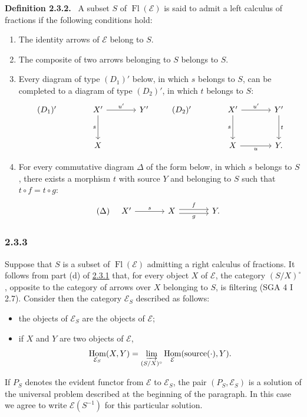 \documentclass[11pt]{article}
\newenvironment{statement}[1]{\par\medskip\noindent\textbf{#1.}\ }{\par\medskip}
\DeclareMathOperator{\Hom}{Hom}
\providecommand{\Hom}{\operatorname{Hom}}
\providecommand{\Fl}{\operatorname{Fl}}
\providecommand{\cE}{\mathcal E}
\providecommand{\source}{\operatorname{source}}
\providecommand{\Hom}{\operatorname{Hom}}
\begin{document}
\label{sga5:V:definition:2.3.2}\begin{statement}{Definition 2.3.2}
A subset $S$ of $\Fl(\cE)$ is said to admit a left calculus of fractions if the following conditions hold:
\begin{enumerate}[label=(\alph*)]
\item[(a')] The identity arrows of $\cE$ belong to $S$.
\item[(b')] The composite of two arrows belonging to $S$ belongs to $S$.
\item[(c')] Every diagram of type $(D_1)'$ below, in which $s$ belongs to $S$, can be completed to a diagram of type $(D_2)'$, in which $t$ belongs to $S$:
\[
\begin{tikzcd}[column sep=large,row sep=large]
(D_1)'& X' \arrow[r,"u'"] \arrow[d,"s"'] & Y'\\
& X
\end{tikzcd}
\qquad
\begin{tikzcd}[column sep=large,row sep=large]
(D_2)'& X' \arrow[r,"u'"] \arrow[d,"s"'] & Y' \arrow[d,"t"]\\
& X \arrow[r,"u"'] & Y .
\end{tikzcd}
\]
\item[(d')] For every commutative diagram $\Delta$ of the form below, in which $s$ belongs to $S$, there exists a morphism $t$ with source $Y$ and belonging to $S$ such that $t\circ f=t\circ g$:
\[
(\Delta)\quad
\begin{tikzcd}[column sep=large]
X' \arrow[r,"s"] & X \arrow[r,shift left,"f"] \arrow[r,shift right,"g"'] & Y .
\end{tikzcd}
\]
\end{enumerate}
\end{statement}

\subsubsection*{2.3.3}\label{sga5:V:subsubsection:2.3.3}
Suppose that $S$ is a subset of $\Fl(\cE)$ admitting a right calculus of fractions. It follows from part (d) of \hyperref[sga5:V:definition:2.3.1]{2.3.1} that, for every object $X$ of $\cE$, the category $(S/X)^\circ$, opposite to the category of arrows over $X$ belonging to $S$, is filtering (SGA 4 I 2.7). Consider then the category $\cE_S$ described as follows:
\begin{itemize}
\item the objects of $\cE_S$ are the objects of $\cE$;
\item if $X$ and $Y$ are two objects of $\cE$,
\[
\Hom_{\cE_S}(X,Y)=\varinjlim_{(S/X)^\circ}\Hom_{\cE}(\source(\cdot),Y).
\]
\end{itemize}
If $P_S$ denotes the evident functor from $\cE$ to $\cE_S$, the pair $(P_S,\cE_S)$ is a solution of the universal problem described at the beginning of the paragraph. In this case we agree to write $\cE(S^{-1})$ for this particular solution.
\end{document}

